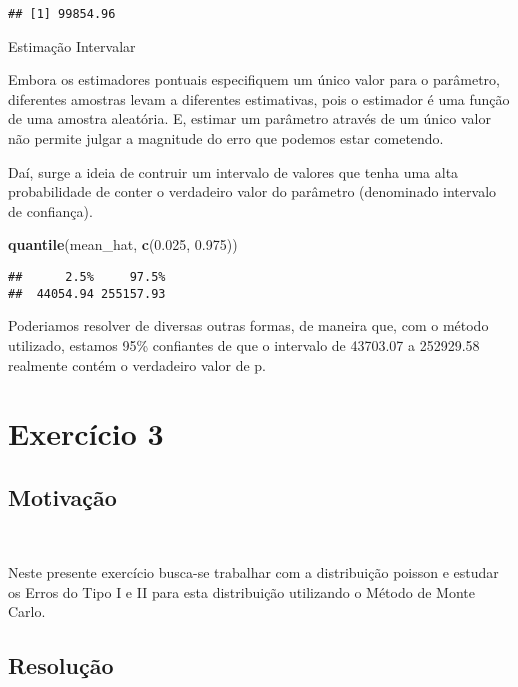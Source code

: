\documentclass[11pt,]{article}
\newenvironment{Shaded}{\begin{snugshade}}{\end{snugshade}}
\newcommand{\FloatTok}[1]{\textcolor[rgb]{0.00,0.00,0.81}{#1}}
\newcommand{\KeywordTok}[1]{\textcolor[rgb]{0.13,0.29,0.53}{\textbf{#1}}}
\newcommand{\NormalTok}[1]{#1}
\begin{document}
\begin{verbatim}
## [1] 99854.96
\end{verbatim}

Estimação Intervalar

Embora os estimadores pontuais especifiquem um único valor para o
parâmetro, diferentes amostras levam a diferentes estimativas, pois o
estimador é uma função de uma amostra aleatória. E, estimar um parâmetro
através de um único valor não permite julgar a magnitude do erro que
podemos estar cometendo.

Daí, surge a ideia de contruir um intervalo de valores que tenha uma
alta probabilidade de conter o verdadeiro valor do parâmetro (denominado
intervalo de confiança).

\begin{Shaded}
\begin{Highlighting}[]
\KeywordTok{quantile}\NormalTok{(mean_hat, }\KeywordTok{c}\NormalTok{(}\FloatTok{0.025}\NormalTok{, }\FloatTok{0.975}\NormalTok{))}
\end{Highlighting}
\end{Shaded}

\begin{verbatim}
##      2.5%     97.5%
##  44054.94 255157.93
\end{verbatim}

Poderiamos resolver de diversas outras formas, de maneira que, com o
método utilizado, estamos 95\% confiantes de que o intervalo de 43703.07
a 252929.58 realmente contém o verdadeiro valor de p.~

\newpage

\hypertarget{exercuxedcio-3}{%
\section{Exercício 3}\label{exercuxedcio-3}}

\hypertarget{motivauxe7uxe3o-2}{%
\subsection{Motivação}\label{motivauxe7uxe3o-2}}

~

Neste presente exercício busca-se trabalhar com a distribuição poisson e
estudar os Erros do Tipo I e II para esta distribuição utilizando o
Método de Monte Carlo.

\hypertarget{resoluuxe7uxe3o-2}{%
\subsection{Resolução}\label{resoluuxe7uxe3o-2}}
\end{document}
